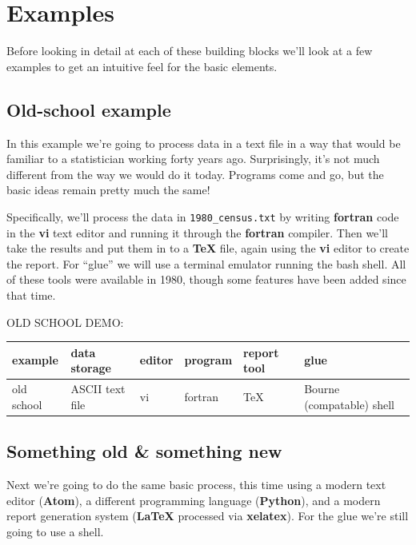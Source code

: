 \documentclass[]{book}
\begin{document}
\hypertarget{examples}{%
\section{Examples}\label{examples}}

Before looking in detail at each of these building blocks we'll look at a few examples to get an intuitive feel for the basic elements.

\hypertarget{old-school-example}{%
\subsection{Old-school example}\label{old-school-example}}

In this example we're going to process data in a text file in a way that would be familiar to a statistician working forty years ago. Surprisingly, it's not much different from the way we would do it today. Programs come and go, but the basic ideas remain pretty much the same!

Specifically, we'll process the data in \texttt{1980\_census.txt} by writing \textbf{fortran} code in the \textbf{vi} text editor and running it through the \textbf{fortran} compiler. Then we'll take the results and put them in to a \textbf{TeX} file, again using the \textbf{vi} editor to create the report. For ``glue'' we will use a terminal emulator running the bash shell. All of these tools were available in 1980, though some features have been added since that time.

OLD SCHOOL DEMO:

\begin{longtable}[]{@{}llllll@{}}
\toprule
example & data storage & editor & program & report tool & glue\tabularnewline
\midrule
\endhead
old school & ASCII text file & vi & fortran & TeX & Bourne (compatable) shell\tabularnewline
\bottomrule
\end{longtable}

\hypertarget{something-old-something-new}{%
\subsection{Something old \& something new}\label{something-old-something-new}}

Next we're going to do the same basic process, this time using a modern text editor (\textbf{Atom}), a different programming language (\textbf{Python}), and a modern report generation system (\textbf{LaTeX} processed via \textbf{xelatex}). For the glue we're still going to use a shell.
\end{document}
